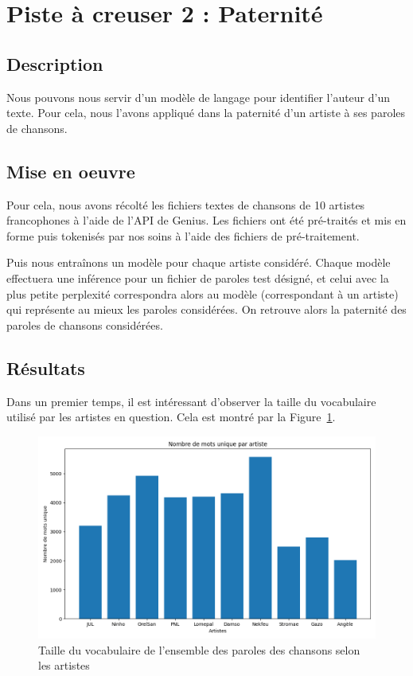 \documentclass[a4paper]{article}
\begin{document}
\section{Piste à creuser 2 : Paternité}

\subsection{Description}
Nous pouvons nous servir d'un modèle de langage pour identifier l'auteur d'un texte. Pour cela, nous l'avons appliqué dans la paternité d'un artiste à ses paroles de chansons. 

\subsection{Mise en oeuvre}
Pour cela, nous avons récolté les fichiers textes de chansons de 10 artistes francophones à l'aide de l'API de Genius. Les 
fichiers ont été pré-traités et mis en forme puis tokenisés par nos soins à l'aide des fichiers de pré-traitement. 

Puis nous entraînons un modèle pour chaque artiste considéré. Chaque modèle effectuera une inférence pour un fichier de paroles test 
désigné, et celui avec la plus petite perplexité correspondra alors au modèle (correspondant à un artiste) qui représente au mieux les 
paroles considérées. On retrouve alors la paternité des paroles de chansons considérées. 

\subsection{Résultats}

Dans un premier temps, il est intéressant d'observer la taille du vocabulaire utilisé par les artistes en question. Cela est montré
par la Figure~\ref{fig:vocab_size}.

\begin{figure}[!ht]
    \centering
    \includegraphics[width=0.7\linewidth]{../results/genius_results/vocab_size_per_artist.png}
    \caption{Taille du vocabulaire de l'ensemble des paroles des chansons selon les artistes}
    \label{fig:vocab_size}
\end{figure}
\end{document}
